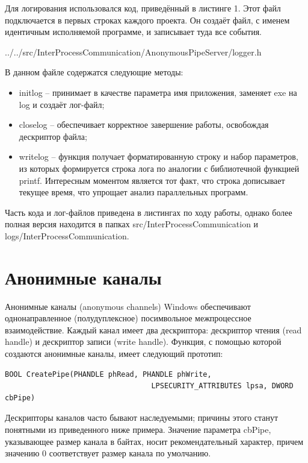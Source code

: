 \documentclass[a4paper, 12pt]{report}		%
\begin{document}
Для логирования использовался код, приведённый в листинге 1. Этот файл подключается в первых строках каждого проекта. Он создаёт файл, с именем идентичным исполняемой программе, и записывает туда все события.
\newpage


{../../src/InterProcessCommunication/AnonymousPipeServer/logger.h}

В данном файле содержатся следующие методы:
\begin{itemize}
\item initlog -- принимает в качестве параметра имя приложения, заменяет exe на log и создаёт лог-файл;
\item closelog -- обеспечивает корректное завершение работы, освобождая дескриптор файла;
\item writelog -- функция получает форматированную строку и набор параметров, из которых формируется строка лога по аналогии с библиотечной функцией printf. Интересным моментом является тот факт, что строка дописывает текущее время, что упрощает анализ параллельных программ.
\end{itemize}

\vspace{1em}
Часть кода и лог-файлов приведена в листингах по ходу работы, однако более полная версия находится в папках src/InterProcessCommunication и logs/InterProcessCommunication.

\chapter*{Анонимные каналы}

Анонимные каналы (anonymous channels) Windows обеспечивают однонаправленное (полудуплексное) посимвольное межпроцессное взаимодействие. Каждый канал имеет два дескриптора: дескриптор чтения (read handle) и дескриптор записи (write handle). Функция, с помощью которой создаются анонимные каналы, имеет следующий прототип:

\begin{verbatim}
BOOL CreatePipe(PHANDLE phRead, PHANDLE phWrite,
                                  LPSECURITY_ATTRIBUTES lpsa, DWORD cbPipe)
\end{verbatim}

Дескрипторы каналов часто бывают наследуемыми; причины этого станут понятными из приведенного ниже примера. Значение параметра cbPipe, указывающее размер канала в байтах, носит рекомендательный характер, причем значению 0 соответствует размер канала по умолчанию.
\end{document}
